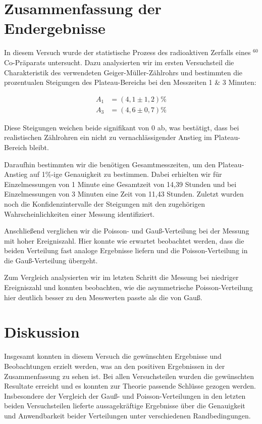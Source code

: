 \documentclass{article}
\begin{document}
\clearpage
\newpage
\section{Zusammenfassung der Endergebnisse}

In diesem Versuch wurde der statistische Prozess des radioaktiven Zerfalls eines $^{60}$Co-Präparats untersucht. Dazu analysierten wir im ersten Versuchsteil die Charakteristik des verwendeten Geiger-Müller-Zählrohrs und bestimmten die prozentualen Steigungen des Plateau-Bereichs bei den Messzeiten 1 \& 3 Minuten:

\begin{equation}
    \begin{split}
        A_1 &= (4,1 \pm 1,2) \% \\
        A_3 &= (4,6 \pm 0,7) \%
    \end{split}
\end{equation}

Diese Steigungen weichen beide signifikant von 0 ab, was bestätigt, dass bei realistischen Zählrohren ein nicht zu vernachlässigender Anstieg im Plateau-Bereich bleibt.

Daraufhin bestimmten wir die benötigen Gesamtmesszeiten, um den Plateau-Anstieg auf 1\%-ige Genauigkeit zu bestimmen. Dabei erhielten wir für Einzelmessungen von 1 Minute eine Gesamtzeit von 14,39 Stunden und bei Einzelmessungen von 3 Minuten eine Zeit von 11,43 Stunden. Zuletzt wurden noch die Konfidenzintervalle der Steigungen mit den zugehörigen Wahrscheinlichkeiten einer Messung identifiziert. 

Anschließend verglichen wir die Poisson- und Gauß-Verteilung bei der Messung mit hoher Ereigniszahl. Hier konnte wie erwartet beobachtet werden, dass die beiden Verteilung fast analoge Ergebnisse liefern und die Poisson-Verteilung in die Gauß-Verteilung übergeht.

Zum Vergleich analysierten wir im letzten Schritt die Messung bei niedriger Ereigniszahl und konnten beobachten, wie die asymmetrische Poisson-Verteilung hier deutlich besser zu den Messwerten passte als die von Gauß.


\newpage
\section{Diskussion}

Insgesamt konnten in diesem Versuch die gewünschten Ergebnisse und Beobachtungen erzielt werden, was an den positiven Ergebnissen in der Zusammenfassung zu sehen ist. Bei allen Versuchsteilen wurden die gewünschten Resultate erreicht und es konnten zur Theorie passende Schlüsse gezogen werden. Insbesondere der Vergleich der Gauß- und Poisson-Verteilungen in den letzten beiden Versuchsteilen lieferte aussagekräftige Ergebnisse über die Genauigkeit und Anwendbarkeit beider Verteilungen unter verschiedenen Randbedingungen. 
\end{document}
